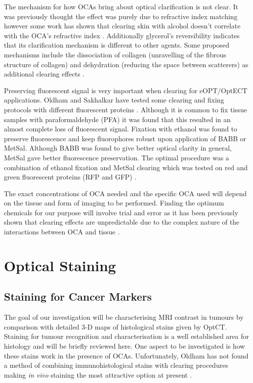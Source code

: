\documentclass[12pt]{article}
\begin{document}
The mechanism for how OCAs bring about optical clarification is not clear. It was previously thought the effect was purely due to refractive index matching however some work has shown that clearing skin with alcohol doesn't correlate with the OCA's refractive index \cite{Choi:2005, Mao:2008}. Additionally glycerol's reversibility indicates that its clarification mechanism is different to other agents. Some  proposed mechanisms include the dissociation of collagen (unravelling of the fibrous structure of collagen) and  dehydration (reducing the space between scatterers) as additional clearing effects \cite{Yeh:2003, Wen:2009is}.




Preserving fluorescent signal is very important when clearing for eOPT/OptECT applications. Oldham and Sakhalkar have tested some clearing and fixing protocols with different fluorescent proteins \cite{Sakhalkar:2007hp, Oldham:2008dfa}. Although it is common to fix tissue samples with paraformaldehyde (PFA) it was found that this resulted in an almost complete loss of fluorescent signal. Fixation with ethanol was found to preserve fluorescence and keep fluorophores robust upon application of BABB or MetSal. Although BABB was found to give better optical clarity in general, MetSal gave better fluorescence preservation. The optimal procedure was a combination of ethanol fixation and MetSal clearing which was tested on red and green fluorescent proteins (RFP and GFP) \cite{Sakhalkar:2007hp}.


The exact concentrations of OCA needed and the specific OCA used will depend on the tissue and form of imaging to be performed. Finding the optimum chemicals for our purpose will involve trial and error as it has been previously shown that clearing effects are unpredictable due to the complex nature of the interactions between OCA and tissue \cite{Wen:2009is}.



\newpage
\section{Optical Staining}
\subsection{Staining for Cancer Markers}

The goal of our investigation will be characterising MRI contrast in tumours by comparison with detailed 3-D maps of histological stains given by OptCT. Staining for tumour recognition and characterisation is a well established area for histology and will be briefly reviewed here.  One aspect to be investigated is how these stains work in the presence of OCAs. Unfortunately, Oldham has not found a method of combining immunohistological stains with clearing procedures making \textit{in vivo} staining the most attractive option at present \cite{Oldham:2008dfa}.
\end{document}
